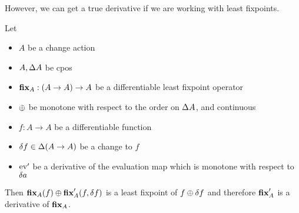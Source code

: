 However, we can get a true derivative if we are working with least fixpoints.

\begin{thm}
\label{thm:leastFixpointDiff}
  Let 
  \begin{itemize}
    \item $A$ be a change action 
    \item $A, \Delta A$ be cpos
    \item$\textbf{fix}_A : (A \rightarrow A) \rightarrow A$ be a differentiable
      least fixpoint operator
    \item $\oplus$ be monotone with respect to the order on $\Delta A$, and continuous
    \item $f: A \rightarrow A$ be a differentiable function
    \item $\delta f \in \Delta (A \rightarrow A)$ be a change to $f$
    \item $\operatorname{ev}'$ be a derivative of the evaluation map which is monotone
      with respect to $\delta a$
  \end{itemize}

  Then $\textbf{fix}_A(f) \oplus \textbf{fix}_A'(f, \delta f)$ is a least
  fixpoint of $f \oplus \delta f$ and therefore $\textbf{fix}_A'$ is a derivative of $\textbf{fix}_A$.
\end{thm}
